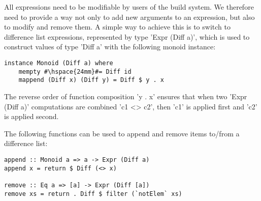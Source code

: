 All expressions need to be modifiable by users of the build system. We therefore
need to provide a way not only to add new arguments to an expression, but also
to modify and remove them. A simple way to achieve this is to switch to difference
list expressions, represented by type \lst'Expr (Diff a)', which is used to
construct values of type \lst'Diff a' with the following monoid instance:

\begin{lstlisting}
instance Monoid (Diff a) where
    mempty #\hspace{24mm}#= Diff id
    mappend (Diff x) (Diff y) = Diff $ y . x
\end{lstlisting}

\noindent The reverse order of function composition \lst'y . x' ensures that
when two \lst'Expr (Diff a)' computations are combined \lst'c1 <> c2', then
\lst'c1' is applied first and \lst'c2' is applied second.

The following functions can be used to append and remove items to/from a
difference list:

\begin{lstlisting}
append :: Monoid a => a -> Expr (Diff a)
append x = return $ Diff (<> x)

remove :: Eq a => [a] -> Expr (Diff [a])
remove xs = return . Diff $ filter (`notElem` xs)
\end{lstlisting}

\newcommand{\tabx}[1]{\hspace{.106\textwidth}\rlap{#1}}
\newcommand{\taby}[1]{\hspace{.103\textwidth}\rlap{#1}}
\newcommand{\tabz}[1]{\hspace{.24\textwidth}\rlap{#1}}

